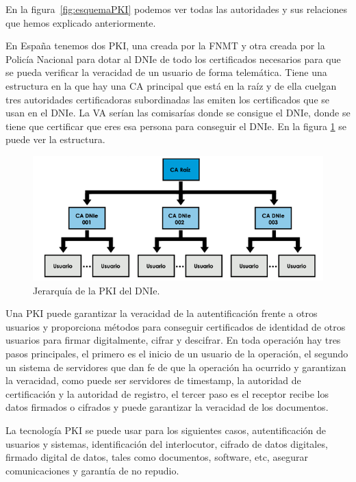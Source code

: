 En la figura~\ref{fig:esquemaPKI} podemos ver todas las autoridades y sus relaciones que hemos explicado anteriormente.

En España tenemos dos PKI, una creada por la FNMT y otra creada por la Policía Nacional para dotar al DNIe de todo los certificados necesarios para que se pueda verificar la veracidad de un usuario de forma telemática. Tiene una estructura en la que hay una CA principal que está en la raíz y de ella cuelgan tres autoridades certificadoras subordinadas las emiten los certificados que se usan en el DNIe. La VA serían las comisarías donde se consigue el DNIe, donde se tiene que certificar que eres esa persona para conseguir el DNIe. En la figura \ref{fig:pkiDnie} se puede ver la estructura.

\begin{figure}
  \centering
    \includegraphics[scale=0.9]{./Criptografia/imagenes/pkiDnie.png}
  \caption{Jerarquía de la PKI del DNIe.}
  \label{fig:pkiDnie}
\end{figure} 

Una PKI puede garantizar la veracidad de la autentificación frente a otros usuarios y proporciona métodos para conseguir certificados de identidad de otros usuarios para firmar digitalmente, cifrar y descifrar. En toda operación hay tres pasos principales, el primero es el inicio de un usuario de la operación, el segundo un sistema de servidores que dan fe de que la operación ha ocurrido y garantizan la veracidad, como puede ser servidores de timestamp, la autoridad de certificación y la autoridad de registro, el tercer paso es el receptor recibe los datos firmados o cifrados y puede garantizar la veracidad de los documentos.

La tecnología PKI se puede usar para los siguientes casos, autentificación de usuarios y sistemas, identificación del interlocutor, cifrado de datos digitales, firmado digital de datos, tales como documentos, software, etc, asegurar comunicaciones y garantía de no repudio.

